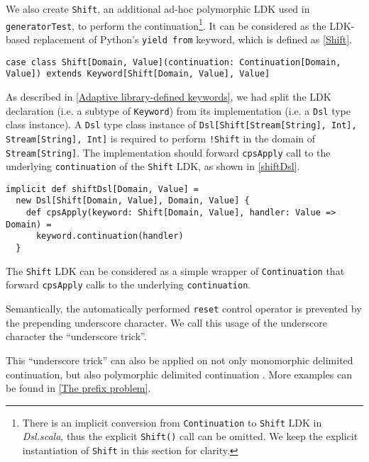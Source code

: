 We also create \lstinline{Shift}, an additional ad-hoc polymorphic LDK used in \lstinline{generatorTest}, to perform the continuation\footnote{There is an implicit conversion from \lstinline{Continuation} to \lstinline{Shift} LDK in \textit{Dsl.scala}, thus the explicit \lstinline{Shift()} call can be omitted. We keep the explicit instantiation of \lstinline{Shift} in this section for clarity.}. It can be considered as the LDK-based replacement of Python's \lstinline{yield from} keyword, which is defined as \cref{Shift}.

\begin{lstlisting}[caption={The definition of \lstinline{Shift} LDK},label={Shift}]
case class Shift[Domain, Value](continuation: Continuation[Domain, Value]) extends Keyword[Shift[Domain, Value], Value]
\end{lstlisting}

As described in \cref{Adaptive library-defined keywords}, we had split the LDK declaration (i.e. a subtype of \lstinline{Keyword}) from its implementation (i.e. a \lstinline{Dsl} type class instance). A \lstinline{Dsl} type class instance of \lstinline{Dsl[Shift[Stream[String], Int], Stream[String], Int]} is required to perform \lstinline{!Shift} in the domain of \lstinline{Stream[String]}. The implementation should forward \lstinline{cpsApply} call to the underlying \lstinline{continuation} of the \lstinline{Shift} LDK, as shown in \cref{shiftDsl}.

\begin{lstlisting}[caption={The \lstinline{Dsl} instance of \lstinline{Shift} LDK, to forward \lstinline{cpsApply} to the underlying \lstinline{continuation}},label={shiftDsl}]
implicit def shiftDsl[Domain, Value] =
  new Dsl[Shift[Domain, Value], Domain, Value] {
    def cpsApply(keyword: Shift[Domain, Value], handler: Value => Domain) =
      keyword.continuation(handler)
  }
\end{lstlisting}

The \lstinline{Shift} LDK can be considered as a simple wrapper of \lstinline{Continuation} that forward \lstinline{cpsApply} calls to the underlying \lstinline{continuation}.

Semantically, the automatically performed \lstinline{reset} control operator is prevented by the prepending underscore character. We call this usage of the underscore character the ``underscore trick''.

This ``underscore trick'' can also be applied on not only monomorphic delimited continuation, but also polymorphic delimited continuation \cite{asai2007polymorphic}. More examples can be found in \cref{The prefix problem}.

